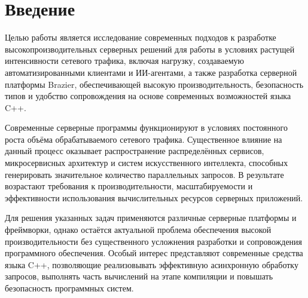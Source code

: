 \documentclass[14pt]{extarticle}
\newcommand{\twelvept}{
  \fontsize{12pt}{14.4pt}\selectfont
}
\begin{document}


\pagebreak

\setcounter{page}{1}

\section{Введение}\label{sec:intro}

Целью работы является исследование современных подходов к разработке высокопроизводительных серверных решений для работы в условиях растущей интенсивности сетевого трафика, включая нагрузку, создаваемую автоматизированными клиентами и ИИ-агентами, а также разработка серверной платформы Brazier, обеспечивающей высокую производительность, безопасность типов и удобство сопровождения на основе современных возможностей языка C++.

Современные серверные программы функционируют в условиях постоянного роста объёма обрабатываемого сетевого трафика. Существенное влияние на данный процесс оказывает распространение распределённых сервисов, микросервисных архитектур и систем искусственного интеллекта, способных генерировать значительное количество параллельных запросов. В результате возрастают требования к производительности, масштабируемости и эффективности использования вычислительных ресурсов серверных приложений.

Для решения указанных задач применяются различные серверные платформы и фреймворки, однако остаётся актуальной проблема обеспечения высокой производительности без существенного усложнения разработки и сопровождения программного обеспечения. Особый интерес представляют современные средства языка C++, позволяющие реализовывать эффективную асинхронную обработку запросов, выполнять часть вычислений на этапе компиляции и повышать безопасность программных систем.
\end{document}
